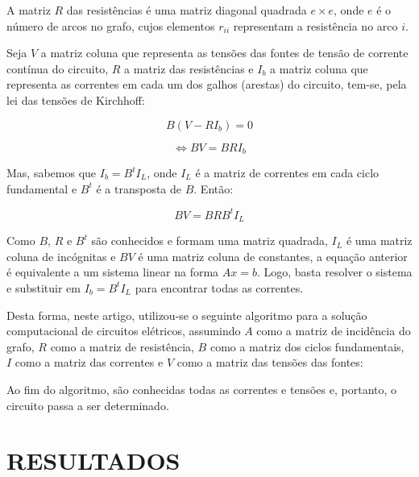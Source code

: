 \documentclass[twocolumn, 10pt]{extarticle}
\begin{document}
A matriz $R$ das resistências é uma matriz diagonal quadrada $e \times e$, onde $e$ é o número de arcos no grafo, cujos elementos $r_{ii}$ representam a resistência no arco $i$.

Seja $V$ a matriz coluna que representa as tensões das fontes de tensão de corrente contínua do circuito, $R$ a matriz das resistências e $I_b$ a matriz coluna que representa as correntes em cada um dos galhos (arestas) do circuito, tem-se, pela lei das tensões de Kirchhoff:

\[
B(V -RI_b) = 0
\]

\[
\iff 
 BV = BRI_b  
\]

Mas, sabemos que $I_b = B^tI_L$, onde $I_L$ é a matriz de correntes em cada ciclo fundamental e $B^t$ é a transposta de $B$. Então:

\[
BV = BRB^tI_L
\]

Como $B$, $R$ e $B^t$ são conhecidos e formam uma matriz quadrada, $I_L$ é uma matriz coluna de incógnitas e $BV$ é uma matriz coluna de constantes, a equação anterior é equivalente a um sistema linear na forma $Ax = b$. Logo, basta resolver o sistema e substituir em $I_b = B^tI_L$ para encontrar todas as correntes.

Desta forma, neste artigo, utilizou-se o seguinte algoritmo para a solução computacional de circuitos elétricos, assumindo $A$ como a matriz de incidência do grafo, $R$ como a matriz de resistência, $B$ como a matriz dos ciclos fundamentais, $I$ como a matriz das correntes e $V$ como a matriz das tensões das fontes:

\begingroup
{}\label{cs}
\begin{algorithmic}[1]
	\Else
	\EndIf
\EndFunction
\end{algorithmic}
\hrulefill
\endgroup

Ao fim do algoritmo, são conhecidas todas as correntes e tensões e, portanto, o circuito passa a ser determinado.


\section{RESULTADOS}
\end{document}
